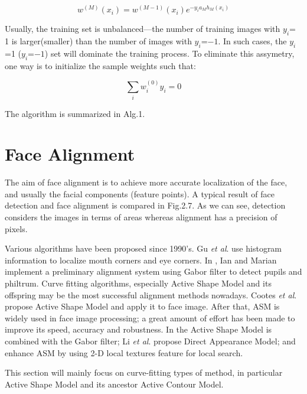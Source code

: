 \documentclass[12pt, twoside]{report}
\begin{document}
	\begin{equation}
		w^{(M)}(x_i) = w^{(M-1)}(x_i)e^{-y_ia_Mh_M(x_i)}
	\end{equation}

	\par	
	Usually, the training set is unbalanced—the number of training images with $y_i$= 1 is larger(smaller) than the number of images with $y_i$=$-1$. In such cases, the $y_i$=1 ($y_i$=$-1$) set will dominate the training process. To eliminate this assymetry, one way is to initialize the sample weights such that:

	\begin{equation}
		\sum_{i}w_i^{(0)} y_i = 0
	\end{equation}

	\par
	The algorithm is summarized in Alg.1.
	
	\section{Face Alignment}
	The aim of face alignment is to achieve more accurate localization of the face, and usually the facial components (feature points). A typical result of face detection and face alignment is compared in Fig.2.7. As we can see, detection considers the images in terms of areas whereas alignment has a precision of pixels.
	\par
	Various algorithms have been proposed since 1990's. Gu \textit{ et al}. \cite{29} use histogram information to localize mouth corners and eye corners. In \cite{26}, Ian and Marian implement a preliminary alignment system using Gabor filter to detect pupils and philtrum. Curve fitting algorithms, especially Active Shape Model \cite{18} and its offspring may be the most successful alignment methods nowadays. Cootes \textit{ et al}. \cite{18} \cite{45} \cite{16} propose Active Shape Model and apply it to face image. After that, ASM is widely used in face image processing; a great amount of effort has been made to improve its speed, accuracy and robustness. In \cite{36} the Active Shape Model is combined with the Gabor filter;
	Li \textit{ et al}. \cite{78} propose Direct Appearance Model; \cite{56} and \cite{101} enhance ASM by using 2-D local textures feature for local search. 

	\par
	This section will mainly focus on curve-fitting types of method, in particular Active Shape Model and its ancestor Active Contour Model. \\ 
	
\end{document}
